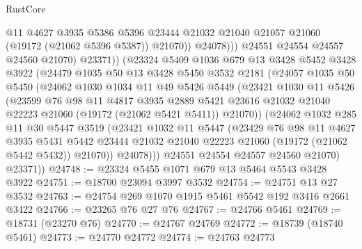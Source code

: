 \begin{lexlean}{RustCore}
\begin{coremodule}
                      @11
                      @4627
                      @3935
                      @5386
                      @5396
                      @23444
                      @21032
                      @21040
                      @21057
                      @21060
                      (@19172 (@21062 @5396 @5387))
                      @21070))
                  @24078)))
            @24551
            @24554
            @24557
            @24560
            @21070)
          @23371))
      (@23324
        @5409
        @1036
        @679
        @13
        @3428
        @5452
        @3428
        @3922
        (@24479
          @1035
          @50
          @13
          @3428
          @5450
          @3532
          @2181
          (@24057
            @1035
            @50
            @5450
            (@24062
              @1030
              @1034
              @11
              @49
              @5426
              @5449
              (@23421
                @1030
                @11
                @5426
                (@23599
                  @76
                  @98
                  @11
                  @4817
                  @3935
                  @2889
                  @5421
                  @23616
                  @21032
                  @21040
                  @22223
                  @21060
                  (@19172 (@21062 @5421 @5411))
                  @21070))
              (@24062
                @1032
                @285
                @11
                @30
                @5447
                @3519
                (@23421
                  @1032
                  @11
                  @5447
                  (@23429
                    @76
                    @98
                    @11
                    @4627
                    @3935
                    @5431
                    @5442
                    @23444
                    @21032
                    @21040
                    @22223
                    @21060
                    (@19172 (@21062 @5442 @5432))
                    @21070))
                @24078)))
          @24551
          @24554
          @24557
          @24560
          @21070)
        @23371))
@24748 := @23324 @5455 @1071 @679 @13 @5464 @5543 @3428 @3922
@24751 := @18700 @23094 @3997 @3532
@24754 := @24751 @13 @27 @3532
@24763 := @24754 @269 @1070 @1915 @5461 @5542 @192 @3416 @2661 @3422
@24766 := @23265 @76 @27 @76
@24767 := @24766 @5461
@24769 := @18731 (@23270 @76)
@24770 := @24767 @24769
@24772 := @18739 (@18740 @5461)
@24773 := @24770 @24772
@24774 := @24763 @24773

\end{coremodule}
\end{lexlean}
